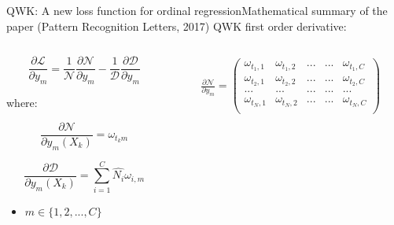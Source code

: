 \documentclass{beamer}
\begin{document}
\begin{frame}{QWK: A new loss function for ordinal regression}{Mathematical summary of the paper (Pattern Recognition Letters, 2017)}	
\alert{QWK first order derivative:}
\begin{columns}
	\begin{column}{0.3\textwidth}
		\begin{equation*}
		\frac{\partial \mathcal{L}}{\partial y_m} = \frac{1}{\mathcal{N}}\frac{\partial \mathcal{N}}{\partial y_m} - \frac{1}{\mathcal{D}}
		\frac{\partial{\mathcal{D}}}{\partial y_m}
		\end{equation*}	
		
		where:
		
		\begin{equation*}
		\frac{\partial \mathcal{N}}{\partial y_m(X_k)} = \omega_{t_k m}
		\end{equation*}
		
		\begin{equation*}
		\frac{\partial \mathcal{D}}{\partial y_m(X_k)} = \sum_{i=1}^{C} \hat{N_i} \omega_{i,m}
		\end{equation*}
		
		\begin{itemize}
			\item[] $m \in \{1, 2, ..., C\}$
		\end{itemize}
		
	\end{column}
	\begin{column}{0.7\textwidth}  %
		\begin{equation*}
		\begin{aligned}
		\frac{\partial \mathcal{N}}{\partial y_m} =
		\begin{pmatrix} 
		\omega_{t_1, 1}     & \omega_{t_1, 2}     & ...     & ... & \omega_{t_1, C}\\ 
		\omega_{t_2, 1}     & \omega_{t_2, 2}     & ...     & ... & \omega_{t_2, C}\\ 
		...					& ...		          & ...     & ... & ...\\
		\omega_{t_N, 1}     & \omega_{t_N, 2}     & ...     & ... & \omega_{t_N, C}\\  
		\end{pmatrix}
		\end{aligned}
		\end{equation*}
		

\end{column}
\end{columns}
\end{frame}
\end{document}
